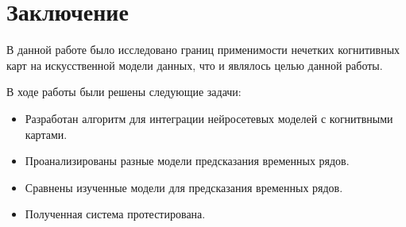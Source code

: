 \chapter*{Заключение}


В данной работе было исследовано
границ применимости нечетких когнитивных карт на искусственной модели данных,
что и являлось целью данной работы.

В ходе работы были решены следующие задачи:

\begin{itemize}
	\item Разработан алгоритм для интеграции нейросетевых моделей с когнитвными картами.
	\item Проанализированы разные модели предсказания временных рядов.
	\item Сравнены изученные модели для предсказания временных рядов.
	\item Полученная система протестирована.
\end{itemize}





